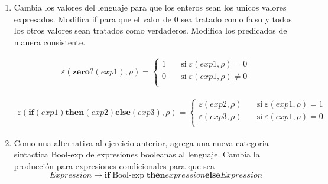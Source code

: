 \documentclass{article}
\begin{document}
\begin{enumerate}
    \begin{itemize}
        \item Léxico \\
        cond \\
        end \\
        =$>$
        \item Sintaxis 
        \begin{itemize}
            \item Concreta \\
                    \[ Expression \to \textbf{cond}\{ Expression => Expression\}* \textbf{end}\]
            \item Abstracta \\
            (cond-exp $exps$) 
        \end{itemize}
        \item Semántica 
    \end{itemize}
    \item Cambia los valores del lenguaje para que los enteros sean los unicos valores expresados. Modifica if para que el valor de 0 sea tratado como falso y todos los otros valores sean tratados como verdaderos. Modifica los predicados de manera consistente.

        \begin{align*}
        \varepsilon(\textbf{zero?}(exp1),\rho)= \begin{cases}
       1 &\quad\text{si} \; \varepsilon(exp1, \rho) = 0\\
       0 &\quad\text{si} \; \varepsilon(exp1, \rho) \neq 0\\ 
     \end{cases}
        \end{align*}

        \begin{align*}
        \varepsilon(\textbf{if}(exp1)\textbf{then}(exp2)\textbf{else}(exp3),\rho)= \begin{cases}
       \varepsilon(exp2, \rho) &\quad\text{si} \; \varepsilon(exp1, \rho) = 1\\
       \varepsilon(exp3, \rho) &\quad\text{si} \; \varepsilon(exp1, \rho) = 0 \\
     \end{cases}
        \end{align*}
    
    
    \item Como una alternativa al ejercicio anterior, agrega una nueva categoria sintactica Bool-exp de expresiones booleanas al lenguaje. Cambia la producción para expresiones condicionales para que sea
    \[ Expression \to \textbf{if} \; \text{Bool-exp} \; \textbf{then} expression \textbf{else} Expression \]


\end{enumerate}
\end{document}

